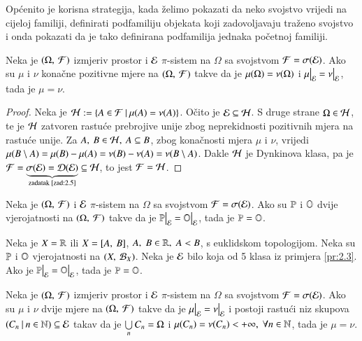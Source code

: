 \begin{nap} \label{nap:2.5-1}
    Op\' cenito je korisna strategija, kada \v zelimo pokazati da neko svojstvo vrijedi na cijeloj familiji, definirati podfamiliju objekata koji zadovoljavaju tra\v zeno svojstvo i onda pokazati da je tako definirana podfamilija jednaka po\v cetnoj familiji. 
\end{nap}


\begin{tm}  \label{tm:2.6}
    Neka je $(\Omega, \: \mathcal{F})$ izmjeriv prostor i $\mathcal{E}$ $\pi$-sistem na $\Omega$ sa svojstvom $\mathcal{F} = \sigma({\mathcal{E}})$.
    Ako su $\mu$ i $\nu$ kona\v cne pozitivne mjere na $(\Omega, \: \mathcal{F})$ takve da je $\mu({\Omega}) = \nu(\Omega)$ i $\restr{\mu}{\famE} = \restr{\nu}{\famE}$, tada je $\mu = \nu$.   
\end{tm}

\begin{proof}
    Neka je $\mathcal{H} := \{{A \in \mathcal{F}} \: | \: {\mu({A}) = \nu(A)}\}$.
    O\v cito je $\mathcal{E} \subseteq \mathcal{H}$. S druge strane $\Omega \in \mathcal{H}$, te je $\mathcal{H}$ zatvoren rastu\' ce prebrojive unije zbog neprekidnosti pozitivnih mjera na rastu\' ce unije.
    Za $A, \: B \in \mathcal{H}, \: A \subseteq B$, zbog kona\v cnosti mjera $\mu$ i $\nu$, vrijedi $\mu({B \setminus A}) = \mu({B}) - \mu({A}) = \nu(B) - \nu(A) = \nu(B \setminus A)$.
    Dakle $\mathcal{H}$ je Dynkinova klasa, pa je $\mathcal{F} = \underbrace{\sigma({\mathcal{E}}) = \mathcal{D}({\mathcal{E}})}_{\textnormal{zadatak \ref{zad:2.5}}} \subseteq \mathcal{H}$, to jest $\mathcal{F} = \mathcal{H}$.
\end{proof}

\begin{kor} \label{kor:2.7}
    Neka je $(\Omega, \: \mathcal{F})$ i $\mathcal{E}$ $\pi$-sistem na $\Omega$ sa svojstvom $\mathcal{F} = \sigma({\mathcal{E}})$.
    Ako su $\mathbb{P}$ i $\mathbb{O}$ dvije vjerojatnosti na $(\Omega, \: \mathcal{F})$ takve da je $\restr{\masP}{\famE} = \restr{\masO}{\famE}$, tada je $\mathbb{P}
    = \mathbb{O}$.
\end{kor}

\begin{kor} \label{kor:2.8}
    Neka je $X = \mathbb{R}$ ili $X = [{A}, \:{B}]$, $A, \; B \in \mathbb{R}, \; A < B$, s euklidskom topologijom.
    Neka su $\mathbb{P}$ i $\mathbb{O}$ vjerojatnosti na $({X}, \: {\mathcal{B}_{X}})$.
    Neka je $\mathcal{E}$ bilo koja od 5 klasa iz primjera \ref{pr:2.3}.
    Ako je $\restr{\masP}{\famE} = \restr{\masO}{\famE}$, tada je $\mathbb{P} = \mathbb{O}$.
\end{kor}

\begin{zad} \label{zad:2.9}
    Neka je $(\Omega, \: \mathcal{F})$ izmjeriv prostor i $\mathcal{E}$ $\pi$-sistem na $\Omega$ sa svojstvom $\mathcal{F} = \sigma({\mathcal{E}})$.
    Ako su $\mu$ i $\nu$ dvije mjere na $(\Omega, \: \mathcal{F})$ takve da je $\restr{\mu}{\famE} = \restr{\nu}{\famE}$ i postoji rastu\' ci niz skupova $({C_n} \: | \: {n \in \mathbb{N}}) \subseteq \mathcal{E}$ takav da je $\bigcup\limits_{n}^{}C_n = \Omega$ i $\mu({C_n}) = \nu(C_n) < +\infty, \;
    \forall n \in \mathbb{N}$, tada je $\mu = \nu$.
\end{zad}

